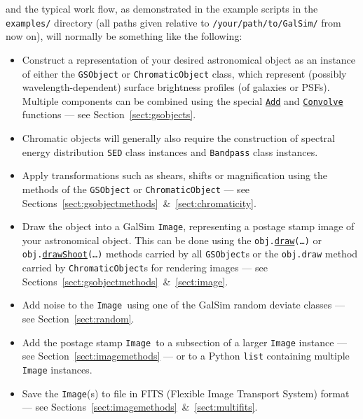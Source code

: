 \documentclass[preprint,11pt]{../../devel/modules/aastex}
\begin{document}
and the typical work flow, as demonstrated in the example scripts in the {\tt
examples/} directory (all paths given relative to
\texttt{/your/path/to/GalSim/} from now on), will normally
be something like the following:
\begin{itemize}

\item Construct a representation of your desired astronomical object
  as an instance of either the {\tt GSObject} or {\tt ChromaticObject} class, which represent (possibly wavelength-dependent) surface brightness profiles (of galaxies or PSFs).  Multiple components can be
  combined using the special
  \href{http://galsim-developers.github.com/GalSim/classgalsim_1_1base_1_1_add.html}{\texttt{Add}}
  and
  \href{http://galsim-developers.github.com/GalSim/classgalsim_1_1base_1_1_convolve.html}{\texttt{Convolve}}
  functions --- see Section~\ref{sect:gsobjects}.
\item Chromatic objects will generally also require the construction of spectral energy distribution
  {\tt SED} class instances and {\tt Bandpass} class instances.
\item Apply transformations such as shears, shifts or magnification
  using the methods of the \texttt{GSObject} or \texttt{ChromaticObject} --- see
  Sections~\ref{sect:gsobjectmethods}~\&~\ref{sect:chromaticity}.
\item Draw the object into a GalSim \texttt{Image}, representing a postage
  stamp image of your astronomical object.  This can be done using the
  \texttt{obj.}\href{http://galsim-developers.github.com/GalSim/classgalsim_1_1base_1_1_g_s_object.html#ae0b346a8b438dedbc7f60a52220869d8}{\texttt{draw}}\texttt{(\dots)}
  or
  \texttt{obj.}\href{http://galsim-developers.github.com/GalSim/classgalsim_1_1base_1_1_g_s_object.html#a42ac334d2840ba3fa832988e998beca0}{\texttt{drawShoot}}\texttt{(\dots)}
  methods carried by all \texttt{GSObject}s or the \texttt{obj.draw} method carried by
  \texttt{ChromaticObject}s for rendering images --- see
  Sections~\ref{sect:gsobjectmethods}~\&~\ref{sect:image}.
\item Add noise to the \texttt{Image}~using one of the GalSim
  random deviate classes --- see Section~\ref{sect:random}.
\item Add the postage stamp \texttt{Image}~to a subsection of a larger
  \texttt{Image}
  instance --- see
  Section~\ref{sect:imagemethods} --- or to a Python
  \texttt{list} containing multiple \texttt{Image} instances.
\item Save the \texttt{Image}(s) to file in FITS (Flexible Image Transport
  System) format --- see Sections~\ref{sect:imagemethods}~\&~\ref{sect:multifits}.
\end{itemize}
\end{document}
